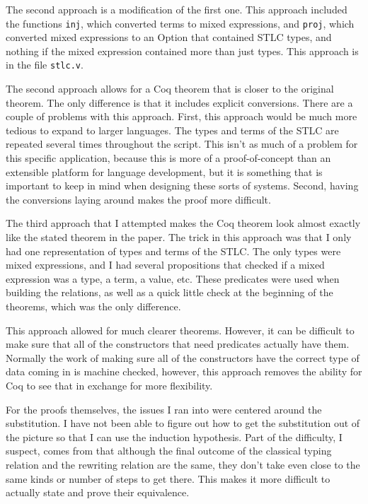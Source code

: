 \documentclass[12pt]{article}
\begin{document}
The second approach is a modification of the first one. This approach included
the functions \texttt{inj}, which converted terms to mixed expressions, and
\texttt{proj}, which converted mixed expressions to an Option that contained
STLC types, and nothing if the mixed expression contained more than just types.
This approach is in the file \texttt{stlc.v}.

The second approach allows for a Coq theorem that is closer to the original
theorem. The only difference is that it includes explicit conversions. There
are a couple of problems with this approach. First, this approach would be much
more tedious to expand to larger languages. The types and terms of the STLC are
repeated several times throughout the script. This isn't as much of a problem
for this specific application, because this is more of a proof-of-concept than
an extensible platform for language development, but it is something that is
important to keep in mind when designing these sorts of systems. Second, having
the conversions laying around makes the proof more difficult. 

The third approach that I attempted makes the Coq theorem look almost exactly
like the stated theorem in the paper. The trick in this approach was that I
only had one representation of types and terms of the STLC. The only types were
mixed expressions, and I had several propositions that checked if a mixed
expression was a type, a term, a value, etc. These predicates were used when
building the relations, as well as a quick little check at the beginning of the
theorems, which was the only difference.

This approach allowed for much clearer theorems. However, it can be difficult
to make sure that all of the constructors that need predicates actually have
them. Normally the work of making sure all of the constructors have the correct
type of data coming in is machine checked, however, this approach removes the
ability for Coq to see that in exchange for more flexibility.

For the proofs themselves, the issues I ran into were centered around the
substitution. I have not been able to figure out how to get the substitution
out of the picture so that I can use the induction hypothesis. Part of the
difficulty, I suspect, comes from that although the final outcome of the
classical typing relation and the rewriting relation are the same, they don't
take even close to the same kinds or number of steps to get there. This makes
it more difficult to actually state and prove their equivalence.
\end{document}
